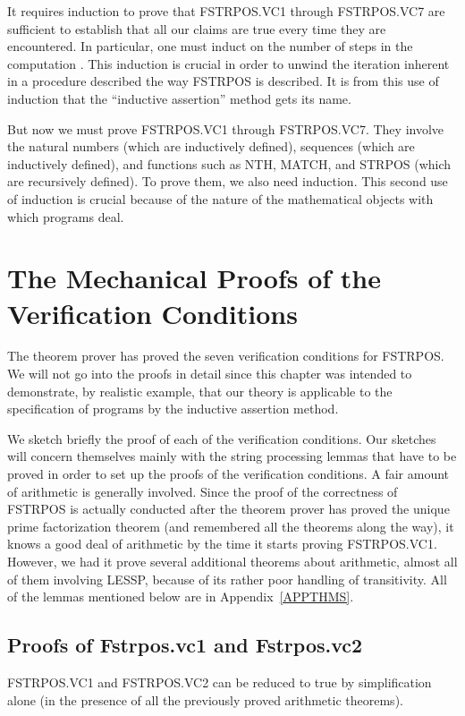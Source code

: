 \documentclass[11pt]{book}
\newcommand{\pubdefaulttextsize}{\large}
\begin{document}
It requires induction to prove that
FSTRPOS.VC1 through FSTRPOS.VC7 are sufficient to
establish that all our claims are true every time they are encountered.
In particular, one must induct on the number of
steps in the computation \cite{FLOYD}.  This induction is crucial in order to unwind
the iteration inherent in a procedure described the way FSTRPOS is described.
It is from this use of induction that the ``inductive assertion''
method gets its name.

But now we must prove FSTRPOS.VC1 through FSTRPOS.VC7.  They involve
the natural numbers (which are inductively defined), sequences (which are
inductively defined), and functions such as NTH, MATCH, and
STRPOS (which are recursively defined).  To prove them, we also  need
induction.  This second use of induction is crucial because of
the nature of the mathematical objects with which programs deal.
\section{The Mechanical Proofs of the Verification Conditions}
\pubdefaulttextsize
The theorem prover has proved the seven verification conditions for
FSTRPOS.  We will not go into the proofs in detail since this chapter
was intended to demonstrate, by realistic example, that our theory is applicable
to the specification of programs by the inductive assertion method.

We  sketch briefly the proof of each of the verification conditions.
Our sketches will concern themselves mainly with the string processing
lemmas that have to be proved in order to set up the proofs of the
verification conditions.  A fair amount of arithmetic
is generally involved.  Since the proof of the correctness of FSTRPOS is
actually conducted after the theorem prover has proved the unique
prime factorization theorem (and remembered all the theorems along the way),
it knows a good deal of arithmetic by the time it starts proving FSTRPOS.VC1.
However, we had  it prove several additional theorems about arithmetic,
almost all of them involving LESSP, because of its rather poor handling
of transitivity.  All of the lemmas mentioned below are in Appendix~\ref{APPTHMS}.
\subsection{Proofs of Fstrpos.vc1 and Fstrpos.vc2}
\pubdefaulttextsize
FSTRPOS.VC1 and FSTRPOS.VC2 can be reduced to true by simplification alone
(in the presence of all the previously proved arithmetic theorems).
\end{document}
